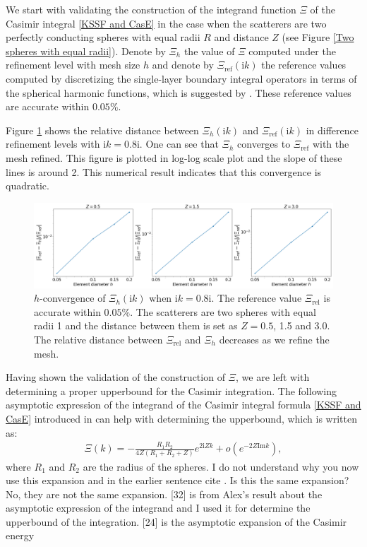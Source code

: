 {\color{teal} We start with validating the construction of the integrand function $\Xi$ of the Casimir integral \eqref{KSSF and CasE} in the case when the scatterers
are two perfectly conducting spheres with equal radii $R$ and distance $Z$ (see Figure \ref{Two spheres with equal radii}). 
Denote by $\Xi_{h}$ the value of $\Xi$ computed under the refinement level with mesh size $h$ and denote by  $\Xi_{\text{ref}}(\mathrm{i}k)$ the
reference values computed by discretizing the single-layer boundary integral operators in terms of the spherical harmonic functions, 
which is suggested by \cite{kenneth2008casimir}. These reference values are accurate within $0.05\%$.


Figure \ref{Scalar_Xi_h_conv} shows the relative distance between $\Xi_{h}(\mathrm{i}k)$ and $\Xi_{\text{ref}}(\mathrm{i}k)$ in difference 
refinement levels with $\mathrm{i}k = 0.8\mathrm{i}$. One can see that $\Xi_{h}$ converges to $\Xi_{\text{ref}}$ with the mesh refined. 
This figure is plotted in log-log scale plot and the slope of these lines is around 2. This numerical result indicates that this convergence is quadratic.}

\begin{figure}[H]
    \centering
    \includegraphics[width = \textwidth]{figures/Scalar_Xi_h_conv_paper.png}
    \caption{$h$-convergence of $\Xi_{h}(\mathrm{i}k)$ when $\mathrm{i}k = 0.8\mathrm{i}$. The reference value $\Xi_{\text{rel}}$ is accurate within $0.05\%$. The scatterers are two spheres with equal radii 1 and the distance between them is set as $Z = 0.5$, 1.5 and 3.0.
    The relative distance between $\Xi_{\text{rel}}$ and $\Xi_{h}$ decreases as we refine the mesh.}
    \label{Scalar_Xi_h_conv}
\end{figure}

{\color{teal} Having shown the validation of the construction of $\Xi$, we are left with determining a proper upperbound for the Casimir integration. 
The following asymptotic expression of the integrand of the Casimir integral formula \eqref{KSSF and CasE} introduced in \cite{fang2021singularity}
can help with determining the upperbound, which is written as:}
\begin{align}\label{asymptotic integrand}
    \Xi(k) = -\frac{R_{1}R_{2}}{4Z(R_{1} + R_{2} + Z)}e^{2\mathrm{i}Zk} + o\left(e^{-2Z\text{Im}k}\right),
\end{align}
where $R_{1}$ and $R_{2}$ are the radius of the spheres.
{\color{red} I do not understand why you now use this expansion and in the earlier sentence cite \cite{emig2008casimir}. Is this the same expansion?} {\color{teal} 
No, they are not the same expansion. [32] is from Alex's result about the asymptotic expression of the integrand and I used it for determine the upperbound of 
the integration. [24] is the asymptotic expansion of the Casimir energy}

